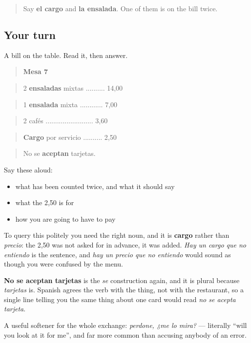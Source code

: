 \label{lesson:ES-C456-sintesis-cuenta}



\begin{quote}
Say \textbf{el cargo} and \textbf{la ensalada}. One of them is on the bill twice.
\end{quote}

\subsection*{Your turn}
A bill on the table. Read it, then answer.

\begin{quote}
\textbf{Mesa 7}
\end{quote}

\begin{quote}
2 \textbf{ensaladas} mixtas .......... 14,00
\end{quote}

\begin{quote}
1 \textbf{ensalada} mixta ............ 7,00
\end{quote}

\begin{quote}
2 cafés ......................... 3,60
\end{quote}

\begin{quote}
\textbf{Cargo} por servicio .......... 2,50
\end{quote}

\begin{quote}
No se \textbf{aceptan} tarjetas.
\end{quote}

Say these aloud:

\begin{itemize}
\raggedright
  \item what has been counted twice, and what it should say
  \item what the 2,50 is for
  \item how you are going to have to pay
\end{itemize}

\begin{culture}
To query this politely you need the right noun, and it is \textbf{cargo} rather than \emph{precio}: the 2,50 was not asked for in advance, it was added. \emph{Hay un cargo que no entiendo} is the sentence, and \emph{hay un precio que no entiendo} would sound as though you were confused by the menu.

\textbf{No se aceptan tarjetas} is the \emph{se} construction again, and it is plural because \emph{tarjetas} is. Spanish agrees the verb with the thing, not with the restaurant, so a single line telling you the same thing about one card would read \emph{no se acepta tarjeta}.

A useful softener for the whole exchange: \emph{perdone, ¿me lo mira?} — literally \textquotedblleft{}will you look at it for me\textquotedblright{}, and far more common than accusing anybody of an error.
\end{culture}


